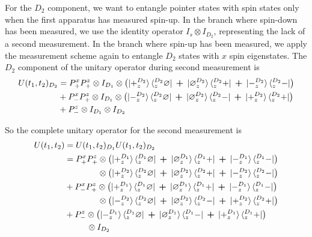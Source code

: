 For the $D_2$ component, we want to entangle pointer states with spin states only when the first apparatus has measured spin-up. In the branch where spin-down has been measured, we use the identity operator $I_s \otimes I_{D_2}$, representing the lack of a second measurement. In the branch where spin-up has been measured, we apply the measurement scheme again to entangle $D_2$ states with $x$ spin eigenstates. The $D_2$ component of the unitary operator during second measurement is
\begin{align}
  U(t_1, t_2)_{D_2} &= P^x_+ P^z_+ \otimes I_{D_1} \otimes \left(\ket{+^{D_2}_z}\bra{^{D_2}_z\varnothing} \: \bm{+} \: \ket{\varnothing^{D_2}_z}\bra{^{D_2}_z+} \: \bm{+} \: \ket{-^{D_2}_z}\bra{^{D_2}_z-} \right) \\ \nonumber
  &+ P^x_- P^z_+ \otimes I_{D_1} \otimes \left(\ket{-^{D_2}_z}\bra{^{D_2}_z\varnothing} \: \bm{+} \: \ket{\varnothing^{D_2}_z}\bra{^{D_2}_z-} \: \bm{+} \: \ket{+^{D_2}_z}\bra{^{D_2}_z+} \right)\\ \nonumber
  &+ P^z_- \otimes I_{D_1} \otimes I_{D_2}
\end{align}


So the complete unitary operator for the second measurement is
\begin{align}
  U(t_1, t_2) &= U(t_1, t_2)_{D_1} U(t_1, t_2)_{D_2} \\ \nonumber
  &= P^x_+ P^z_+ \otimes \left(\ket{+^{D_1}_z}\bra{^{D_1}_z\varnothing} \: \bm{+} \: \ket{\varnothing^{D_1}_z}\bra{^{D_1}_z+} \: \bm{+} \: \ket{-^{D_1}_z}\bra{^{D_1}_z-} \right) \\ \nonumber
  & \phantom{{} = P^x_+ P^z_+} \otimes  \left(\ket{+^{D_2}_z}\bra{^{D_2}_z\varnothing} \: \bm{+} \: \ket{\varnothing^{D_2}_z}\bra{^{D_2}_z+} \: \bm{+} \: \ket{-^{D_2}_z}\bra{^{D_2}_z-} \right) \\ \nonumber
  &+ P^x_- P^z_+ \otimes \left(\ket{+^{D_1}_z}\bra{^{D_1}_z\varnothing} \: \bm{+} \: \ket{\varnothing^{D_1}_z}\bra{^{D_1}_z+} \: \bm{+} \: \ket{-^{D_1}_z}\bra{^{D_1}_z-} \right) \\ \nonumber
  & \phantom{{} = P^x_+ P^z_+} \otimes  \left(\ket{-^{D_2}_z}\bra{^{D_2}_z\varnothing} \: \bm{+} \: \ket{\varnothing^{D_2}_z}\bra{^{D_2}_z-} \: \bm{+} \: \ket{+^{D_2}_z}\bra{^{D_2}_z+} \right) \\ \nonumber
  &+ P^z_- \otimes \left(\ket{-^{D_1}_z}\bra{^{D_1}_z\varnothing} \: \bm{+} \: \ket{\varnothing^{D_1}_z}\bra{^{D_1}_z-} \: \bm{+} \: \ket{+^{D_1}_z}\bra{^{D_1}_z+} \right) \\ \nonumber
  & \phantom{{}={}P^z_+} \otimes I_{D_2}
\end{align}

